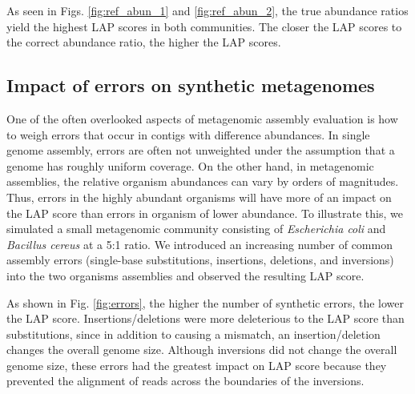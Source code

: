 \documentclass[conference]{IEEEtran}
\begin{document}


As seen in Figs. \ref{fig:ref_abun_1} and \ref{fig:ref_abun_2}, the true abundance ratios yield the highest LAP scores in both communities.
The closer the LAP scores to the correct abundance ratio, the higher the LAP scores.

\subsection{Impact of errors on synthetic metagenomes}

One of the often overlooked aspects of metagenomic assembly evaluation is how to weigh errors that occur in contigs with difference abundances.
In single genome assembly, errors are often not unweighted under the assumption that a genome has roughly uniform coverage.
On the other hand, in metagenomic assemblies, the relative organism abundances can vary by orders of magnitudes.
Thus, errors in the highly abundant organisms will have more of an impact on the LAP score than errors in organism of lower abundance.
To illustrate this, we simulated a small metagenomic community consisting of \emph{Escherichia coli} and \emph{Bacillus cereus} at a 5:1 ratio.
We introduced an increasing number of common assembly errors (single-base substitutions, insertions, deletions, and inversions) into the two organisms assemblies and observed the resulting LAP score.

As shown in Fig. \ref{fig:errors}, the higher the number of synthetic errors, the lower the LAP score.
Insertions/deletions were more deleterious to the LAP score than substitutions, since in addition to causing a mismatch, an insertion/deletion changes the overall genome size.
Although inversions did not change the overall genome size, these errors had the greatest impact on LAP score because they prevented the alignment of reads across the boundaries of the inversions.
\end{document}
